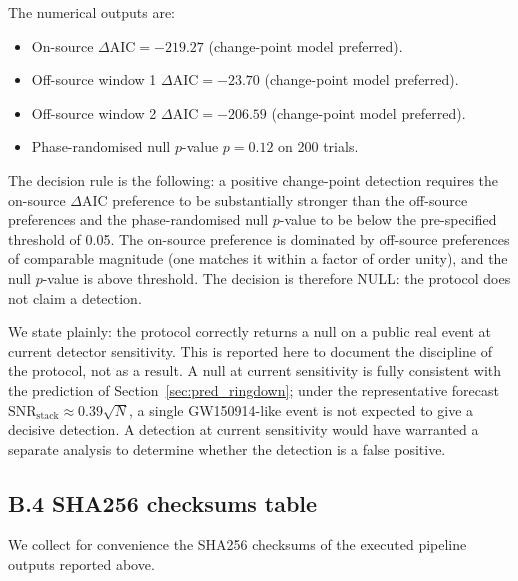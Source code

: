 ﻿\documentclass[12pt,a4paper]{article}
\theoremstyle{definition}
\begin{document}
The numerical outputs are:
\begin{itemize}
  \item On-source $\Delta\mathrm{AIC} = -219.27$ (change-point model preferred).
  \item Off-source window 1 $\Delta\mathrm{AIC} = -23.70$ (change-point model preferred).
  \item Off-source window 2 $\Delta\mathrm{AIC} = -206.59$ (change-point model preferred).
  \item Phase-randomised null $p$-value $p = 0.12$ on 200 trials.
\end{itemize}
The decision rule is the following: a positive change-point detection requires the on-source $\Delta\mathrm{AIC}$ preference to be substantially stronger than the off-source preferences and the phase-randomised null $p$-value to be below the pre-specified threshold of 0.05. The on-source preference is dominated by off-source preferences of comparable magnitude (one matches it within a factor of order unity), and the null $p$-value is above threshold. The decision is therefore NULL: the protocol does not claim a detection.

We state plainly: the protocol correctly returns a null on a public real event at current detector sensitivity. This is reported here to document the discipline of the protocol, not as a result. A null at current sensitivity is fully consistent with the prediction of Section~\ref{sec:pred_ringdown}; under the representative forecast $\mathrm{SNR}_{\mathrm{stack}}\approx0.39\sqrt{N}$, a single GW150914-like event is not expected to give a decisive detection. A detection at current sensitivity would have warranted a separate analysis to determine whether the detection is a false positive.

\subsection{B.4 SHA256 checksums table}
\label{app:pipeline_checksums}

We collect for convenience the SHA256 checksums of the executed pipeline outputs reported above.
\end{document}
